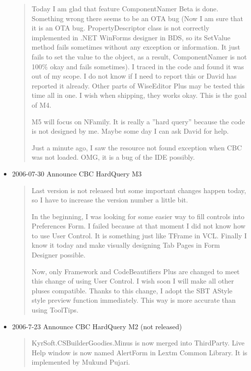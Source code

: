 \begin{itemize}
\begin{quotation}
    Today I am glad that feature ComponentNamer Beta is done. Something
    wrong there seems to be an OTA bug (Now I am sure that it is an OTA
    bug. PropertyDescriptor class is not correctly implemented in .NET
    WinForms designer in BDS, so its SetValue method fails sometimes
    without any exception or information. It just fails to set the value
    to the object, as a result, ComponentNamer is not 100\% okay and
    fails sometimes). I traced in the code and found it was out of my
    scope. I do not know if I need to report this or David has reported
    it already. Other parts of WiseEditor Plus may be tested this time
    all in one. I wish when shipping, they works okay. This is the goal
    of M4.

    M5 will focus on NFamily. It is really a ''hard query'' because the
    code is not designed by me. Maybe some day I can ask David for help.

    Just a minute ago, I saw the resource not found exception when CBC was
    not loaded. OMG, it is a bug of the IDE possibly.
  \end{quotation}

  \item 2006-07-30 Announce CBC HardQuery M3
  \begin{quotation}
    Last version is not released but some important changes happen today,
    so I have to increase the version number a little bit.

    In the beginning, I was looking for some easier way to fill controls
    into Preferences Form. I failed because at that moment I did not know
    how to use User Control. It is something just like TFrame in VCL.
    Finally I know it today and make visually designing Tab Pages in Form
    Designer possible.

    Now, only Framework and CodeBeautifiers Plus are changed to meet this
    change of using User Control. I wish soon I will make all other pluses
    compatible. Thanks to this change, I adopt the SBT AStyle style preview
    function immediately. This way is more accurate than using ToolTips.
  \end{quotation}

  \item 2006-7-23 Announce CBC HardQuery M2 (not released)

  \begin{quotation}
    KyrSoft.CSBuilderGoodies.M\-in\-us is now merged into ThirdParty.
    Live Help window is now named AlertForm in Lextm Common Library. It
    is implemented by Mukund Pujari.


\end{quotation}
\end{itemize}
